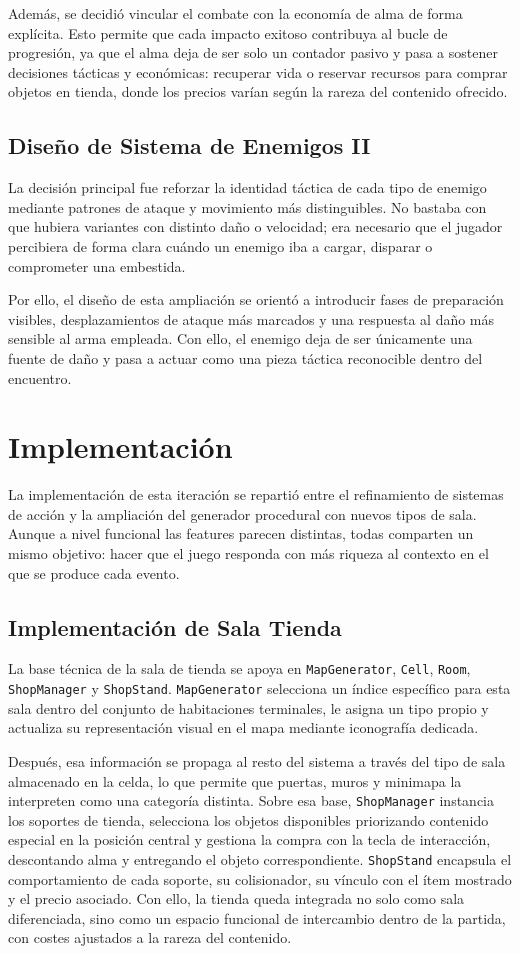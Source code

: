 Además, se decidió vincular el combate con la economía de alma de forma explícita. Esto
permite que cada impacto exitoso contribuya al bucle de progresión, ya que el alma deja de
ser solo un contador pasivo y pasa a sostener decisiones tácticas y económicas: recuperar
vida o reservar recursos para comprar objetos en tienda, donde los precios varían según la
rareza del contenido ofrecido.

\subsection{Diseño de Sistema de Enemigos II}
La decisión principal fue reforzar la identidad táctica de cada tipo de enemigo mediante
patrones de ataque y movimiento más distinguibles. No bastaba con que hubiera variantes con
distinto daño o velocidad; era necesario que el jugador percibiera de forma clara cuándo un
enemigo iba a cargar, disparar o comprometer una embestida.

Por ello, el diseño de esta ampliación se orientó a introducir fases de preparación visibles,
desplazamientos de ataque más marcados y una respuesta al daño más sensible al arma empleada.
Con ello, el enemigo deja de ser únicamente una fuente de daño y pasa a actuar como una
pieza táctica reconocible dentro del encuentro.

\section{Implementación}
La implementación de esta iteración se repartió entre el refinamiento de sistemas de acción
y la ampliación del generador procedural con nuevos tipos de sala. Aunque a nivel funcional
las features parecen distintas, todas comparten un mismo objetivo: hacer que el juego
responda con más riqueza al contexto en el que se produce cada evento.

\subsection{Implementación de Sala Tienda}
La base técnica de la sala de tienda se apoya en \texttt{MapGenerator}, \texttt{Cell},
\texttt{Room}, \texttt{ShopManager} y \texttt{ShopStand}. \texttt{MapGenerator} selecciona
un índice específico para esta sala dentro del conjunto de habitaciones terminales, le
asigna un tipo propio y actualiza su representación visual en el mapa mediante iconografía
dedicada.

Después, esa información se propaga al resto del sistema a través del tipo de sala
almacenado en la celda, lo que permite que puertas, muros y minimapa la interpreten como una
categoría distinta. Sobre esa base, \texttt{ShopManager} instancia los soportes de tienda,
selecciona los objetos disponibles priorizando contenido especial en la posición central y
gestiona la compra con la tecla de interacción, descontando alma y entregando el objeto
correspondiente. \texttt{ShopStand} encapsula el comportamiento de cada soporte, su
colisionador, su vínculo con el ítem mostrado y el precio asociado. Con ello, la tienda queda
integrada no solo como sala diferenciada, sino como un espacio funcional de intercambio
dentro de la partida, con costes ajustados a la rareza del contenido.

